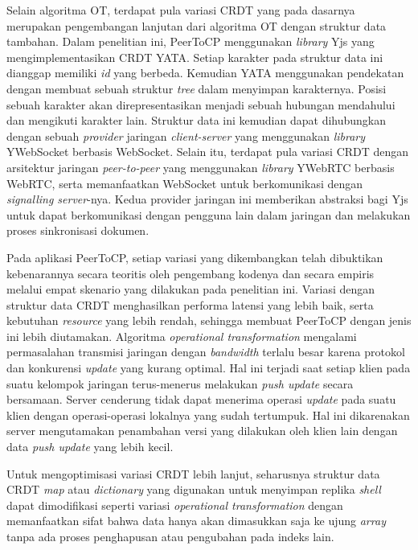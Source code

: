 Selain algoritma OT, terdapat pula variasi CRDT yang pada dasarnya merupakan pengembangan lanjutan dari algoritma OT dengan struktur data tambahan. Dalam penelitian ini, PeerToCP menggunakan \textit{library} Yjs yang mengimplementasikan CRDT YATA. Setiap karakter pada struktur data ini dianggap memiliki \textit{id} yang berbeda. Kemudian YATA menggunakan pendekatan dengan membuat sebuah struktur \textit{tree} dalam menyimpan karakternya. Posisi sebuah karakter akan direpresentasikan menjadi sebuah hubungan mendahului dan mengikuti karakter lain. Struktur data ini kemudian dapat dihubungkan dengan sebuah \textit{provider} jaringan \textit{client-server} yang menggunakan \textit{library} YWebSocket berbasis WebSocket. Selain itu, terdapat pula variasi CRDT dengan arsitektur jaringan \textit{peer-to-peer} yang menggunakan \textit{library} YWebRTC berbasis WebRTC, serta memanfaatkan WebSocket untuk berkomunikasi dengan \textit{signalling server}-nya. Kedua provider jaringan ini memberikan abstraksi bagi Yjs untuk dapat berkomunikasi dengan pengguna lain dalam jaringan dan melakukan proses sinkronisasi dokumen.

Pada aplikasi PeerToCP, setiap variasi yang dikembangkan telah dibuktikan kebenarannya secara teoritis oleh pengembang kodenya dan secara empiris melalui empat skenario yang dilakukan pada penelitian ini. Variasi dengan struktur data CRDT menghasilkan performa latensi yang lebih baik, serta kebutuhan \textit{resource} yang lebih rendah, sehingga membuat PeerToCP dengan jenis ini lebih diutamakan. Algoritma \textit{operational transformation} mengalami permasalahan transmisi jaringan dengan \textit{bandwidth} terlalu besar karena protokol dan konkurensi \textit{update} yang kurang optimal. Hal ini terjadi saat setiap klien pada suatu kelompok jaringan terus-menerus melakukan \textit{push update} secara bersamaan. Server cenderung tidak dapat menerima operasi \textit{update} pada suatu klien dengan operasi-operasi lokalnya yang sudah tertumpuk. Hal ini dikarenakan server mengutamakan penambahan versi yang dilakukan oleh klien lain dengan data \textit{push update} yang lebih kecil.

Untuk mengoptimisasi variasi CRDT lebih lanjut, seharusnya struktur data CRDT \textit{map} atau \textit{dictionary} yang digunakan untuk menyimpan replika \textit{shell} dapat dimodifikasi seperti variasi \textit{operational transformation} dengan memanfaatkan sifat bahwa data hanya akan dimasukkan saja ke ujung \textit{array} tanpa ada proses penghapusan atau pengubahan pada indeks lain.

